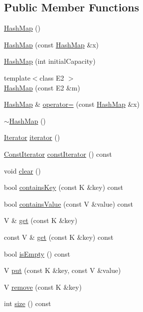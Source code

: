 \subsection*{Public Member Functions}
\begin{DoxyCompactItemize}
\item 
\hyperlink{class_hash_map_aa93ddf9596512c3e842fe59ca15e9e13}{HashMap} ()
\item 
\hyperlink{class_hash_map_a3067fc2e4f1e3dca0666a74cfe574aba}{HashMap} (const \hyperlink{class_hash_map}{HashMap} \&x)
\item 
\hyperlink{class_hash_map_a0df361108ae553ae4e89106dbb21121a}{HashMap} (int initialCapacity)
\item 
{\footnotesize template$<$class E2 $>$ }\\\hyperlink{class_hash_map_ad6a979c9927c1cd8c19b00a067f625a8}{HashMap} (const E2 \&m)
\item 
\hyperlink{class_hash_map}{HashMap} \& \hyperlink{class_hash_map_ab6c4c9d3ca5b69d7c19bb10ec6f6b527}{operator=} (const \hyperlink{class_hash_map}{HashMap} \&x)
\item 
\hyperlink{class_hash_map_a3d7c06dec87b3d40af6910cb401f8dcb}{$\sim$HashMap} ()
\item 
\hyperlink{class_hash_map_1_1_iterator}{Iterator} \hyperlink{class_hash_map_aa3b142edfeb0e72ecf6741a2ffe6007f}{iterator} ()
\item 
\hyperlink{class_hash_map_1_1_const_iterator}{ConstIterator} \hyperlink{class_hash_map_a484e1e766dcc2c90f7a085c19c1e8d71}{constIterator} () const 
\item 
void \hyperlink{class_hash_map_a126d97ebd7a4a0c5d88a6e1cc8e1a8eb}{clear} ()
\item 
bool \hyperlink{class_hash_map_a845b9f47bbde02094ae9f60fbd2cc380}{containsKey} (const K \&key) const 
\item 
bool \hyperlink{class_hash_map_a0b236f958ef6ac2706c8127c27024a99}{containsValue} (const V \&value) const 
\item 
V \& \hyperlink{class_hash_map_aa83f1bf4f5c04a3b1cdfc57bcaa8918e}{get} (const K \&key)
\item 
const V \& \hyperlink{class_hash_map_aa0d97505a2c30b30913ede8d89429a92}{get} (const K \&key) const 
\item 
bool \hyperlink{class_hash_map_afc5be2f3abd968fc5a6b276e2d48215f}{isEmpty} () const 
\item 
V \hyperlink{class_hash_map_adbe7c76672b49498a6c43ee54e62d11c}{put} (const K \&key, const V \&value)
\item 
V \hyperlink{class_hash_map_a1ed3ded70279d176b2cf15cd5535ae15}{remove} (const K \&key)
\item 
int \hyperlink{class_hash_map_ab7977a0f47381547893744d66c213897}{size} () const 
\end{DoxyCompactItemize}


